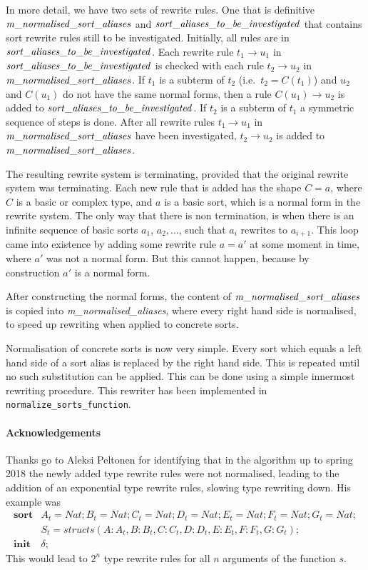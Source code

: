 \documentclass{article}
\begin{document}
In more detail, we have two sets of rewrite rules. One that is definitive
${\it m\_normalised\_sort\_aliases}$ and $\it sort\_aliases\_to\_be\_investigated$ 
that contains sort rewrite rules
still to be investigated. Initially, all rules are in 
$\it sort\_aliases\_to\_be\_investigated$. Each rewrite rule $t_1\rightarrow u_1$
in $\it sort\_aliases\_to\_be\_investigated$ is checked with
each rule $t_2\rightarrow u_2$ in ${\it m\_normalised\_sort\_aliases}$.
If $t_1$ is a subterm of $t_2$ (i.e.\ $t_2=C(t_1)$) and 
$u_2$ and $C(u_1)$ do not have the same normal forms, then a rule $C(u_1)\rightarrow
u_2$ is added to $\it sort\_aliases\_to\_be\_investigated$.
If $t_2$ is a subterm of $t_1$ a symmetric sequence of steps is done.
After all rewrite rules $t_1\rightarrow u_1$ in ${\it m\_normalised\_sort\_aliases}$
have been investigated, $t_2\rightarrow u_2$ is added to 
${\it m\_normalised\_sort\_aliases}$.

The resulting rewrite system is terminating, provided that the original rewrite system
was terminating. Each new rule that is added has the shape $C = a$, where $C$ is
a basic or complex type, and $a$ is a basic sort, which is a normal form in the
rewrite system. The only way that there is non termination, is when there
is an infinite sequence of basic sorts $a_1$, $a_2,\ldots$, such that $a_i$ rewrites
to $a_{i+1}$. This loop came into existence by adding some rewrite rule $a=a'$ at
some moment in time, where $a'$ was not a normal form. But this cannot happen,
because by construction $a'$ is a normal form.

After constructing the normal forms, the content of ${\it m\_normalised\_sort\_aliases}$
is copied into {\it m\_normalised\_aliases}, where every right hand side is normalised,
to speed up rewriting when applied to concrete sorts.

Normalisation of concrete sorts is now very simple. Every sort which equals a
left hand side of a sort alias is replaced by the right hand side. This is repeated
until no such substitution can be applied. This can be done using a simple 
innermost rewriting procedure. This rewriter has been implemented in 
{\tt normalize\_sorts\_function}.

\paragraph{Acknowledgements}
Thanks go to Aleksi Peltonen for identifying that in the algorithm up to spring 2018 the newly 
added type rewrite rules were not normalised, leading to the addition of an exponential 
type rewrite rules, slowing type rewriting down. His example was
\[\begin{array}{ll}
\textbf{sort}&A_t = Nat; B_t = Nat; C_t = Nat; D_t = Nat; E_t = Nat; F_t = Nat; G_t = Nat;\\
             &S_t = struct s(A:A_t, B:B_t, C:C_t, D:D_t, E:E_t, F:F_t, G:G_t);\\
\textbf{init}&\delta;
\end{array}\]
This would lead to $2^n$ type rewrite rules for all $n$ arguments of the function $s$. 
\end{document}
